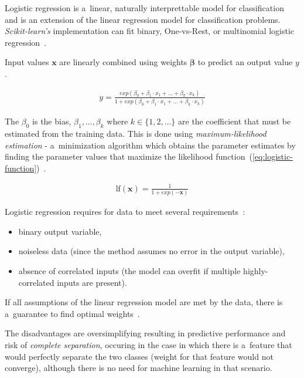 Logistic regression is a~linear, naturally interprettable model for classification and is an extension of the linear regression model for classification problems.
\textit{Scikit-learn's} implementation can fit binary, One-vs-Rest, or multinomial logistic regression~\cite{scikit-learn}.

Input values \( \mathbf{x} \) are linearly combined using weights \( \mathbf{\beta} \) to predict an output value \( y \).

\begin{align}
    y = \frac{exp(\beta_0 + \beta_1 \cdot x_1 + \ldots + \beta_k \cdot x_k)}{1 + exp(\beta_0 + \beta_1 \cdot x_1 + \ldots + \beta_k \cdot x_k)}
\end{align}

The \( \beta_0 \) is the bias, \( \beta_1, \ldots, \beta_k \) where \( k \in \{ 1, 2, \ldots \} \) are the coefficient that must be estimated from the training data.
This is done using \textit{maximum-likelihood estimation} - a~minimization algorithm which obtains the parameter estimates by finding the parameter values that maximize the likelihood function~(\ref{eq:logistic-function})~\cite{web:logistic-regression}.

\begin{align}
    \text{lf}(\mathbf{x})=\frac{1}{1+exp(-\mathbf{x})} \label{eq:logistic-function}
\end{align}

Logistic regression requires for data to meet several requirements~\cite{web:logistic-regression}:

\begin{itemize}
    \item binary output variable,
    \item noiseless data (since the method assumes no error in the output variable),
    \item absence of correlated inputs (the model can overfit if multiple highly-correlated inputs are present).
\end{itemize}

If all assumptions of the linear regression model are met by the data, there is a~guarantee to find optimal weights~\cite{web:logistic-regression}.

The disadvantages are oversimplifying resulting in  predictive performance and risk of \textit{complete separation}, occuring in the case in which there is a~feature that would perfectly separate the two classes (weight for that feature would not converge), although there is no need for machine learning in that scenario.

